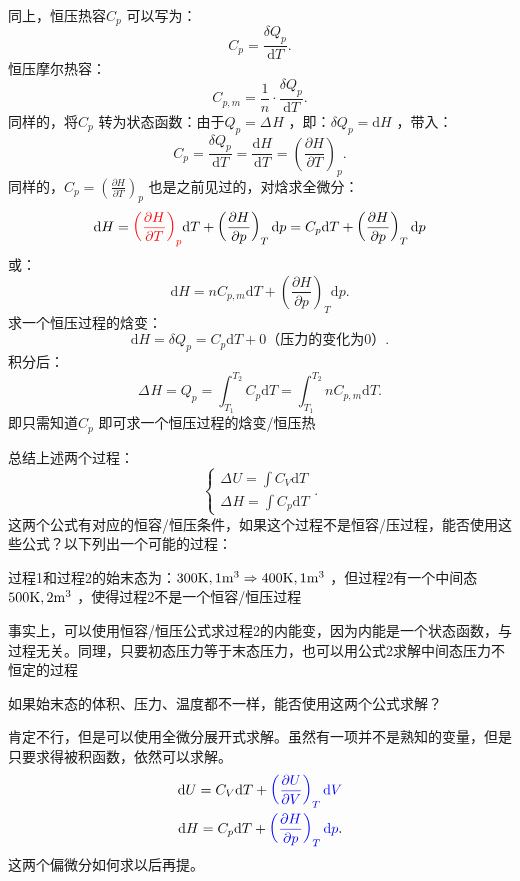 同上，恒压热容$C_{p}$ 可以写为：\[
    C_{p} = \frac{\delta Q_{p}}{\mathrm{d}T}
.\]
恒压摩尔热容：\[
    C_{p,m} = \frac{1}{n}\cdot \frac{\delta Q_{p}}{\mathrm{d}T}
.\]
同样的，将$C_{p}$ 转为状态函数：由于$Q_{p} = \Delta_\text{}H $ ，即：$\delta Q_{p} = \mathrm{d}H$ ，带入：\[
    C_{p} = \frac{\delta Q_{p}}{\mathrm{d}T} = \frac{\mathrm{d}H}{\mathrm{d}T} = \left(\frac{\partial H}{\partial T}\right)_{p}
.\]
同样的，$C_{p} = \left(\frac{\partial H}{\partial T}\right)_{p}$ 也是之前见过的，对焓求全微分：\[
    \mathrm{d}H = \textcolor{red}{\left(\frac{\partial H}{\partial T}\right)_{p}}\mathrm{d}T + \left(\frac{\partial H}{\partial p}\right)_{T}\mathrm{d}p = C_{p}\mathrm{d}T + \left(\frac{\partial H}{\partial p}\right)_{T}\mathrm{d}p
\]
或： \[
    \mathrm{d}H = nC_{p,m}\mathrm{d}T + \left(\frac{\partial H}{\partial p}\right)_{T}\mathrm{d}p
.\]
求一个恒压过程的焓变：\[
    \mathrm{d}H = \delta Q_{p} = C_{p}\mathrm{d}T + 0\text{（压力的变化为0）}
.\]
积分后：\[\boxed{
    \Delta_\text{}H = Q_{p} = \int_{T_1}^{T_2} C_{p} \mathrm{d}T = \int_{T_1}^{T_2} nC_{p,m} \mathrm{d}T
.}\]
即只需知道$C_{p}$ 即可求一个恒压过程的焓变/恒压热
\begin{question}
    总结上述两个过程：\[
        \begin{cases}
            \Delta_\text{}U = \int C_{V} \mathrm{d}T\\
            \Delta_\text{}H = \int C_{p} \mathrm{d}T
        \end{cases}
    .\]
    这两个公式有对应的恒容/恒压条件，如果这个过程不是恒容/压过程，能否使用这些公式？以下列出一个可能的过程：

    过程1和过程2的始末态为：$300\ce{K},1\ce{m}^{3}\Rightarrow 400\ce{K},1\ce{m}^{3}$ ，但过程2有一个中间态$500\ce{K},2\ce{m}^{3}$ ，使得过程2不是一个恒容/恒压过程
\end{question}
事实上，可以使用恒容/恒压公式求过程2的内能变，因为内能是一个状态函数，与过程无关。同理，只要初态压力等于末态压力，也可以用公式2求解中间态压力不恒定的过程
\begin{question}
如果始末态的体积、压力、温度都不一样，能否使用这两个公式求解？
\end{question}
肯定不行，但是可以使用全微分展开式求解。虽然有一项并不是熟知的变量，但是只要求得被积函数，依然可以求解。
\begin{align*}
    \mathrm{d}U = C_{V}\mathrm{d}T + \textcolor{blue}{\left(\frac{\partial U}{\partial V}\right)_{T}\mathrm{d}V}\\
    \mathrm{d}H = C_{p}\mathrm{d}T + \textcolor{blue}{\left(\frac{\partial H}{\partial p}\right)_{T}\mathrm{d}p}
.\end{align*}
这两个偏微分如何求以后再提。

